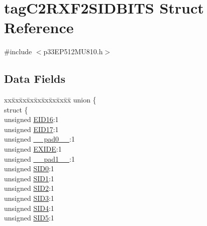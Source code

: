 \hypertarget{structtag_c2_r_x_f2_s_i_d_b_i_t_s}{}\section{tag\+C2\+R\+X\+F2\+S\+I\+D\+B\+I\+TS Struct Reference}
\label{structtag_c2_r_x_f2_s_i_d_b_i_t_s}


{\ttfamily \#include $<$p33\+E\+P512\+M\+U810.\+h$>$}

\subsection*{Data Fields}
\begin{DoxyCompactItemize}
\item 
\begin{tabbing}
xx\=xx\=xx\=xx\=xx\=xx\=xx\=xx\=xx\=\kill
union \{\\
\>struct \{\\
\>\>unsigned \hyperlink{structtag_c2_r_x_f2_s_i_d_b_i_t_s_a6dd5663b0c9838c56db040560ca0efa1}{EID16}:1\\
\>\>unsigned \hyperlink{structtag_c2_r_x_f2_s_i_d_b_i_t_s_aa648615464b0eb29967529333eee9fd9}{EID17}:1\\
\>\>unsigned \hyperlink{structtag_c2_r_x_f2_s_i_d_b_i_t_s_adf71f3d8410c1f1dbbc96680a92c49af}{\_\_pad0\_\_}:1\\
\>\>unsigned \hyperlink{structtag_c2_r_x_f2_s_i_d_b_i_t_s_a09ff1c1be3927220bd3dfbc10edfe243}{EXIDE}:1\\
\>\>unsigned \hyperlink{structtag_c2_r_x_f2_s_i_d_b_i_t_s_acaf2d0924a107ec6e8d2e31febaf66f9}{\_\_pad1\_\_}:1\\
\>\>unsigned \hyperlink{structtag_c2_r_x_f2_s_i_d_b_i_t_s_a1ca276ac15df60e1f7b9a6d0011ade93}{SID0}:1\\
\>\>unsigned \hyperlink{structtag_c2_r_x_f2_s_i_d_b_i_t_s_a3405d354f81391f879648f69f504dfc8}{SID1}:1\\
\>\>unsigned \hyperlink{structtag_c2_r_x_f2_s_i_d_b_i_t_s_ad744966dfc49307f731b7045b01b94e5}{SID2}:1\\
\>\>unsigned \hyperlink{structtag_c2_r_x_f2_s_i_d_b_i_t_s_a9345f3e64720be93e83d8dfc827f3f45}{SID3}:1\\
\>\>unsigned \hyperlink{structtag_c2_r_x_f2_s_i_d_b_i_t_s_aefb106fed4bb40e2c3c71ac612c554e3}{SID4}:1\\
\>\>unsigned \hyperlink{structtag_c2_r_x_f2_s_i_d_b_i_t_s_a0f221b3c9612231686bf87ccdcec8489}{SID5}:1\\

\end{tabbing}
\end{DoxyCompactItemize}
